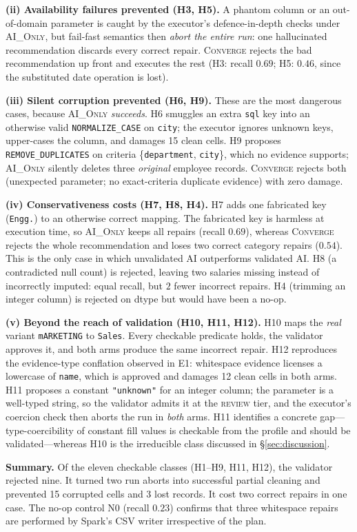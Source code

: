 \noindent\textbf{(ii) Availability failures prevented (H3, H5).} A phantom column or an out-of-domain parameter is caught by the executor's defence-in-depth checks under \textsc{AI\_Only}, but fail-fast semantics then \emph{abort the entire run}: one hallucinated recommendation discards every correct repair. \textsc{Converge} rejects the bad recommendation up front and executes the rest (H3: recall $0.69$; H5: $0.46$, since the substituted date operation is lost).

\noindent\textbf{(iii) Silent corruption prevented (H6, H9).} These are the most dangerous cases, because \textsc{AI\_Only} \emph{succeeds}. H6 smuggles an extra \texttt{sql} key into an otherwise valid \texttt{NORMALIZE\_CASE} on \texttt{city}; the executor ignores unknown keys, upper-cases the column, and damages 15 clean cells. H9 proposes \texttt{REMOVE\_DUPLICATES} on criteria \{\texttt{department}, \texttt{city}\}, which no evidence supports; \textsc{AI\_Only} silently deletes three \emph{original} employee records. \textsc{Converge} rejects both (unexpected parameter; no exact-criteria duplicate evidence) with zero damage.

\noindent\textbf{(iv) Conservativeness costs (H7, H8, H4).} H7 adds one fabricated key (\texttt{Engg.}) to an otherwise correct mapping. The fabricated key is harmless at execution time, so \textsc{AI\_Only} keeps all repairs (recall $0.69$), whereas \textsc{Converge} rejects the whole recommendation and loses two correct category repairs ($0.54$). This is the only case in which unvalidated AI outperforms validated AI. H8 (a contradicted null count) is rejected, leaving two salaries missing instead of incorrectly imputed: equal recall, but $2$ fewer incorrect repairs. H4 (trimming an integer column) is rejected on dtype but would have been a no-op.

\noindent\textbf{(v) Beyond the reach of validation (H10, H11, H12).} H10 maps the \emph{real} variant \texttt{mARKETING} to \texttt{Sales}. Every checkable predicate holds, the validator approves it, and both arms produce the same incorrect repair. H12 reproduces the evidence-type conflation observed in E1: whitespace evidence licenses a lowercase of \texttt{name}, which is approved and damages 12 clean cells in both arms. H11 proposes a constant \texttt{"unknown"} for an integer column; the parameter is a well-typed string, so the validator admits it at the \textsc{review} tier, and the executor's coercion check then aborts the run in \emph{both} arms. H11 identifies a concrete gap---type-coercibility of constant fill values is checkable from the profile and should be validated---whereas H10 is the irreducible class discussed in \S\ref{sec:discussion}.

\noindent\textbf{Summary.} Of the eleven checkable classes (H1--H9, H11, H12), the validator rejected nine. It turned two run aborts into successful partial cleaning and prevented 15 corrupted cells and 3 lost records. It cost two correct repairs in one case. The no-op control N0 (recall $0.23$) confirms that three whitespace repairs are performed by Spark's CSV writer irrespective of the plan.
